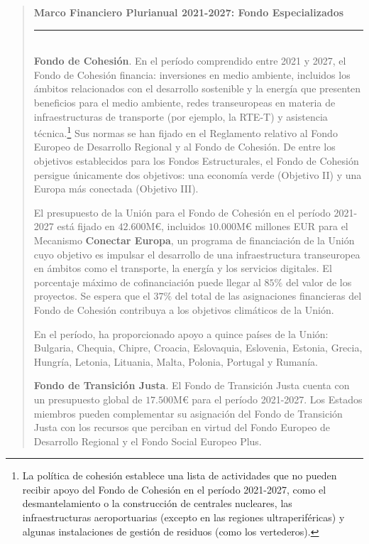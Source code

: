 \documentclass[10pt,a4paper]{article}
\newenvironment{specialblock}[1]{%
      \begin{quote} %
      \small %
      \noindent\textbf{#1}\\[-0.3em] %
      \rule{\linewidth}{0.4pt}\\[0.6em]}{
      \end{quote}}
\begin{document}
\begin{specialblock}{Marco Financiero Plurianual 2021-2027: Fondo Especializados}
    \textbf{Fondo de Cohesión}. En el período comprendido entre 2021 y 2027, el Fondo de Cohesión financia: inversiones en medio ambiente, incluidos los ámbitos relacionados con el desarrollo sostenible y la energía que presenten beneficios para el medio ambiente, redes transeuropeas en materia de infraestructuras de transporte (por ejemplo, la RTE-T) y asistencia técnica.\footnote{%
        La política de cohesión establece una lista de actividades que no pueden recibir apoyo del Fondo de Cohesión en el período 2021-2027, como el desmantelamiento o la construcción de centrales nucleares, las infraestructuras aeroportuarias (excepto en las regiones ultraperiféricas) y algunas instalaciones de gestión de residuos (como los vertederos).
    } Sus normas se han fijado en el Reglamento relativo al Fondo Europeo de Desarrollo Regional y al Fondo de Cohesión. De entre los objetivos establecidos para los Fondos Estructurales, el Fondo de Cohesión persigue únicamente dos objetivos: una economía verde (Objetivo II) y una Europa más conectada (Objetivo III).

    El presupuesto de la Unión para el Fondo de Cohesión en el período 2021-2027 está fijado en $42.600\text{M}€$, incluidos $10.000\text{M}€$ millones EUR para el Mecanismo \textbf{Conectar Europa}, un programa de financiación de la Unión cuyo objetivo es impulsar el desarrollo de una infraestructura transeuropea en ámbitos como el transporte, la energía y los servicios digitales. El porcentaje máximo de cofinanciación puede llegar al $85\%$ del valor de los proyectos. Se espera que el $37\%$ del total de las asignaciones financieras del Fondo de Cohesión contribuya a los objetivos climáticos de la Unión.

    En el período, ha proporcionado apoyo a quince países de la Unión: Bulgaria, Chequia, Chipre, Croacia, Eslovaquia, Eslovenia, Estonia, Grecia, Hungría, Letonia, Lituania, Malta, Polonia, Portugal y Rumanía.

    \textbf{Fondo de Transición Justa}. El Fondo de Transición Justa cuenta con un presupuesto global de $17.500\text{M}€$ para el período 2021-2027. Los Estados miembros pueden complementar su asignación del Fondo de Transición Justa con los recursos que perciban en virtud del Fondo Europeo de Desarrollo Regional y el Fondo Social Europeo Plus.
\end{specialblock}
\end{document}
